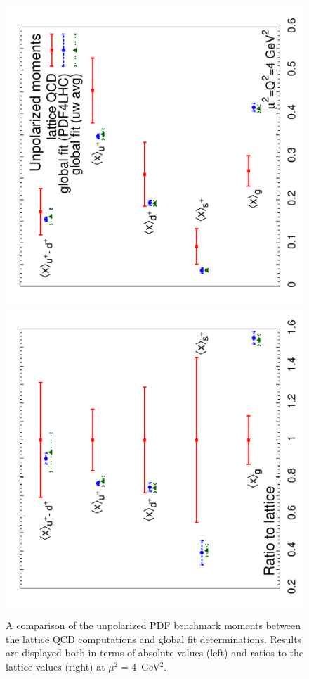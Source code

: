 \begin{figure}[!t]
\centering
\includegraphics[scale=0.44,angle=270]{plots/unpmoms}
\includegraphics[scale=0.44,angle=270]{plots/unpmomsratio}\\
\caption{\small A comparison of the unpolarized PDF benchmark moments 
between the lattice QCD computations and global fit determinations.
%
Results are displayed both in terms of absolute values (left) and ratios to
the lattice values (right) at $\mu^2=4$~GeV$^2$.}
\label{fig:Bmomsunp}
\end{figure} 

